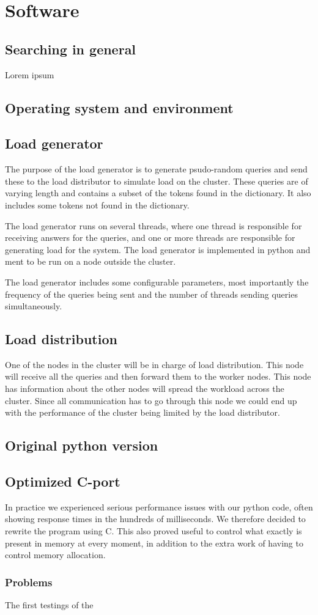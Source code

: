 
\section{Software}
\subsection{Searching in general}
Lorem ipsum\cite{IntroIR}
\subsection{Operating system and environment}
\subsection{Load generator}
The purpose of the load generator is to generate psudo-random queries and send these to the load distributor to simulate load on the cluster. These queries are of varying length and contains a subset of the tokens found in the dictionary. It also includes some tokens not found in the dictionary.

The load generator runs on several threads, where one thread is responsible for receiving answers for the queries, and one or more threads are responsible for generating load for the system. The load generator is implemented in python and ment to be run on a node outside the cluster.

The load generator includes some configurable parameters, most importantly the frequency of the queries being sent and the number of threads sending queries simultaneously.

\subsection{Load distribution}
One of the nodes in the cluster will be in charge of load distribution. This node will receive all the queries and then forward them to the worker nodes. This node has information about the other nodes will spread the workload across the cluster. Since all communication has to go through this node we could end up with the performance of the cluster being limited by the load distributor.

\subsection{Original python version}

\subsection{Optimized C-port}
In practice we experienced serious performance issues with our python code, often showing response times in the hundreds of milliseconds. We therefore decided to rewrite the program using C. This also proved useful to control what exactly is present in memory at every moment, in addition to the extra work of having to control memory allocation.
\subsubsection{Problems}
The first testings of the

